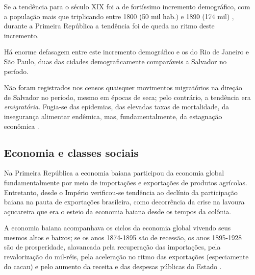 Se a tendência para o século XIX foi a de fortíssimo incremento demográfico, com a população mais que triplicando entre 1800 (50 mil hab.) e 1890 (174 mil) \cite[p.~70]{sampaio_formas_1999}, durante a Primeira República a tendência foi de queda no ritmo deste incremento.



Há enorme defasagem entre este incremento demográfico e os do Rio de Janeiro e São Paulo, duas das cidades demograficamente comparáveis a Salvador no período.



Não foram registrados nos censos quaisquer movimentos migratórios na direção de Salvador no período, mesmo em épocas de seca; pelo contrário, a tendência era \textit{emigratória}. Fugia-se das epidemias, das elevadas taxas de mortalidade, da insegurança alimentar endêmica, mas, fundamentalmente, da estagnação econômica \cite{santos_repovo_2001}.

\subsection{Economia e classes sociais}\label{subsubsec:ecobasa}

Na Primeira República a economia baiana participou da economia global fundamentalmente por meio de importações e exportações de produtos agrícolas. Entretanto, desde o Império verificou-se tendência ao declínio da participação baiana na pauta de exportações brasileira, como decorrência da crise na lavoura açucareira que era o esteio da economia baiana desde os tempos da colônia.

A economia baiana acompanhava os ciclos da economia global vivendo seus mesmos altos e baixos; se os anos 1874-1895 são de recessão, os anos 1895-1928 são de prosperidade, alavancada pela recuperação das importações, pela revalorização do mil-réis, pela aceleração no ritmo das exportações (especiamente do cacau) e pelo aumento da receita e das despesas públicas do Estado \cite[p.~28-29]{CPE1980}.

